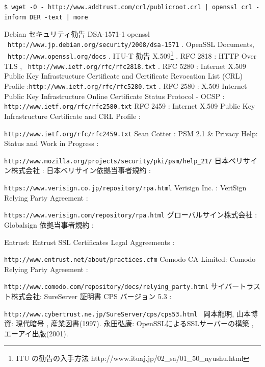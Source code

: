 \documentclass[mingoth,a4paper]{jsarticle}
\begin{document}
\begin{verbatim}
$ wget -O - http://www.addtrust.com/crl/publicroot.crl | openssl crl -inform DER -text | more
\end{verbatim}

\begin{thebibliography}{99}
 Debian セキュリティ勧告  DSA-1571-1 openssl \ {\tt http://www.jp.debian.org/security/2008/dsa-1571} .
 OpenSSL Documents, \ {\tt http://www.openssl.org/docs} .
 ITU-T 勧告 X.509\footnote{ITU の勧告の入手方法 http://www.ituaj.jp/02\_sa/01\_50\_nyushu.html} .
 RFC 2818 : HTTP Over TLS ,  \ {\tt http://www.ietf.org/rfc/rfc2818.txt} .
 RFC 5280 : Internet X.509 Public Key Infrastructure Certificate and Certificate Revocation List (CRL) Profile :\hfil {\tt http://www.ietf.org/rfc/rfc5280.txt} .
 RFC 2580 : X.509 Internet Public Key Infrastructure Online Certificate Status Protocol - OCSP : {\tt http://www.ietf.org/rfc/rfc2580.txt}
 RFC 2459 : Internet X.509 Public Key Infrastructure Certificate and CRL Profile :\hfil\par {\tt http://www.ietf.org/rfc/rfc2459.txt}
 Sean Cotter : PSM 2.1 \& Privacy Help: Status and Work in Progress :\hfil\par {\tt http://www.mozilla.org/projects/security/pki/psm/help\_21/}
  日本ベリサイン株式会社 : 日本ベリサイン依拠当事者規約 :\hfill\par {\tt https://www.verisign.co.jp/repository/rpa.html}
  Verisign Inc. : VeriSign Relying Party Agreement :\hfill\par {\tt https://www.verisign.com/repository/rpa.html}
  グローバルサイン株式会社 : Globalsign 依拠当事者規約 :\hfill\par{}
  Entrust: Entrust SSL Certificates Legal Aggreements :\hfill\par {\tt http://www.entrust.net/about/practices.cfm}
  Comodo CA Limited: Comodo Relying Party Agreement  : \hfill\par {\tt http://www.comodo.com/repository/docs/relying\_party.html}
  サイバートラスト株式会社: SureServer 証明書 CPS バージョン 5.3  :\hfill\par {\tt http://www.cybertrust.ne.jp/SureServer/cps/cps53.html }
 岡本龍明, 山本博資:  現代暗号 , 産業図書(1997).
 永田弘康:  OpenSSLによるSSLサーバーの構築 , エーアイ出版(2001).
\end{thebibliography}
\end{document}
